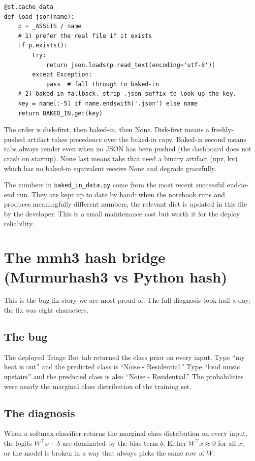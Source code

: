 \documentclass[11pt,letterpaper]{book}
\begin{document}
\begin{lstlisting}
@st.cache_data
def load_json(name):
    p = _ASSETS / name
    # 1) prefer the real file if it exists
    if p.exists():
        try:
            return json.loads(p.read_text(encoding='utf-8'))
        except Exception:
            pass  # fall through to baked-in
    # 2) baked-in fallback. strip .json suffix to look up the key.
    key = name[:-5] if name.endswith('.json') else name
    return BAKED_IN.get(key)
\end{lstlisting}

The order is disk-first, then baked-in, then None. Disk-first means a freshly-pushed artifact takes precedence over the baked-in copy. Baked-in second means tabs always render even when no JSON has been pushed (the dashboard does not crash on startup). None last means tabs that need a binary artifact (npz, kv) which has no baked-in equivalent receive None and degrade gracefully.

The numbers in \texttt{baked\_in\_data.py} come from the most recent successful end-to-end run. They are kept up to date by hand: when the notebook runs and produces meaningfully different numbers, the relevant dict is updated in this file by the developer. This is a small maintenance cost but worth it for the deploy reliability.

\section{The mmh3 hash bridge (Murmurhash3 vs Python hash)}

This is the bug-fix story we are most proud of. The full diagnosis took half a day; the fix was eight characters.

\subsection*{The bug}

The deployed Triage Bot tab returned the class prior on every input. Type ``my heat is out'' and the predicted class is ``Noise - Residential.'' Type ``loud music upstairs'' and the predicted class is also ``Noise - Residential.'' The probabilities were nearly the marginal class distribution of the training set.

\subsection*{The diagnosis}

When a softmax classifier returns the marginal class distribution on every input, the logits $W^\top x + b$ are dominated by the bias term $b$. Either $W^\top x \approx 0$ for all $x$, or the model is broken in a way that always picks the same row of $W$.
\end{document}
